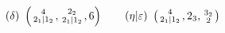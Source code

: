 \[
(\delta)\ \left(\begin{smallmatrix}4\\\unsure{2_1|1_2}\end{smallmatrix},\begin{smallmatrix}2_2\\\unsure{2_1|1_2}\end{smallmatrix},6\right)\qquad (\unsure{\eta|\varepsilon})\ \left(\begin{smallmatrix}4\\\unsure{2_1|1_2}\end{smallmatrix},2_3,\begin{smallmatrix}3_2\\\deleted{\unsure2}\end{smallmatrix}\right)
\]
